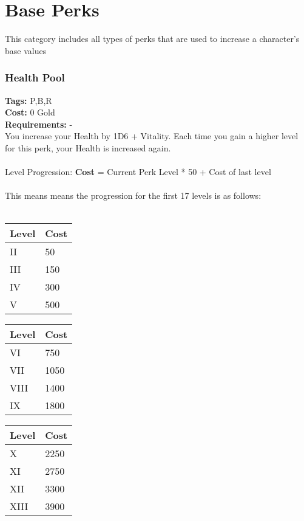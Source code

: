\chapter{Base Perks}\label{ch:basePerks}
This category includes all types of perks that are used to increase a character's base values

\subsection{Health Pool}\label{subsec:healthPool}
\textbf{Tags:} P,B,R\\
\textbf{Cost:} 0 Gold\\
\textbf{Requirements:} -\\
You increase your Health by 1D6 + Vitality.
Each time you gain a higher level for this perk, your Health is increased again.\\
\\
Level Progression: \textbf{Cost} = Current Perk Level * 50 + Cost of last level\\
\\
This means means the progression for the first 17 levels is as follows:\\
\\
\begin{minipage}{0.25\textwidth}
    \begin{tabular}{l | l}
        Level & Cost\\ \hline
        II & 50\\
        III & 150\\
        IV & 300\\
        V & 500\\
    \end{tabular}
\end{minipage}
\begin{minipage}{0.25\textwidth}
    \begin{tabular}{l | l}
        Level & Cost\\ \hline
        VI & 750\\
        VII & 1050\\
        VIII & 1400\\
        IX & 1800\\
    \end{tabular}
\end{minipage}
\begin{minipage}{0.25\textwidth}
    \begin{tabular}{l | l}
        Level & Cost\\ \hline
        X & 2250\\
        XI & 2750\\
        XII & 3300\\
        XIII & 3900\\
    \end{tabular}
\end{minipage}
